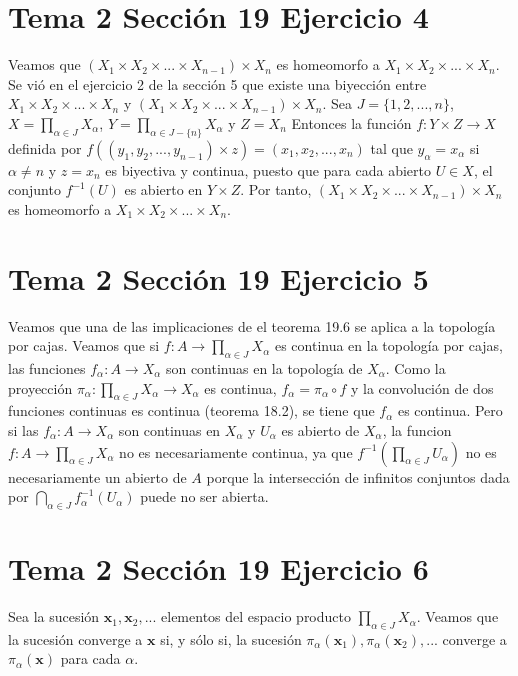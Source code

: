 \documentclass{article}
\newcommand{\vect}[1]{\boldsymbol{#1}}
\begin{document}
\section{Tema 2 Sección 19 Ejercicio 4}
Veamos que $\left(X_1\times X_2\times ...\times X_{n-1}\right)\times X_n$ es homeomorfo a $X_1\times X_2\times ...\times X_n$. Se vió en el ejercicio 2 de la sección 5 que existe una biyección entre $X_1\times X_2\times ...\times X_n$ y $ \left(X_1\times X_2\times ...\times X_{n-1}\right)\times X_n$. Sea $J=\{1,2,...,n\}$,  $X=\prod_{\alpha\in J}X_\alpha$,  $Y=\prod_{\alpha\in J-\{n\}}X_\alpha$ y $Z=X_n$ Entonces la función $f:Y\times Z\rightarrow X$ definida por $f(\left(y_1,y_2,...,y_{n-1}\right)\times z)=(x_1,x_2,...,x_n)$ tal que $y_\alpha=x_\alpha$ si $\alpha\neq n$ y $z=x_n$ es biyectiva y continua, puesto que para cada abierto $U\in X$, el conjunto $ f^{-1}(U)$ es abierto en $Y\times Z$. Por tanto, $ \left(X_1\times X_2\times ...\times X_{n-1}\right)\times X_n$ es homeomorfo a $X_1\times X_2\times ...\times X_n$.
\section{Tema 2 Sección 19 Ejercicio 5}
Veamos que una de las implicaciones de el teorema 19.6 se aplica a la topología por cajas. Veamos que si $f :A\rightarrow \prod_{\alpha \in J}X_\alpha$ es continua en la topología por cajas, las funciones  $f_\alpha :A\rightarrow X_\alpha$ son continuas en la topología de $X_\alpha$. Como la proyección $\pi_\alpha:\prod_{\alpha\in J}X_\alpha\rightarrow X_\alpha$ es continua, $f_\alpha =  \pi_\alpha\circ f$ y la convolución de dos funciones continuas es continua (teorema 18.2), se tiene que $f_\alpha$
es continua. Pero si las $f_\alpha:A\rightarrow X_\alpha$ son continuas en $X_\alpha$ y $U_\alpha$ es abierto de $X_\alpha$, la funcion $f :A\rightarrow \prod_{\alpha \in J}X_\alpha$ no es necesariamente continua, ya que $f^{-1}(\prod_{\alpha\in J}U_\alpha)$ no es necesariamente un abierto de $A$ porque la intersección  de infinitos conjuntos dada por $\bigcap_{\alpha\in J }f^{-1}_\alpha(U_\alpha)$ puede no ser abierta.

\section{Tema 2 Sección 19 Ejercicio 6}
Sea la sucesión $\vect{x}_1,\vect{x}_2,...$
elementos del espacio producto $\prod_{\alpha\in J}X_\alpha$. Veamos que la sucesión converge a $\vect{x}$ si, y sólo si, la sucesión $\pi_\alpha(\vect{x}_1),\pi_\alpha(\vect{x}_2),...$ converge a $\pi_\alpha(\vect{x})$ para cada $\alpha$. 
\end{document}

